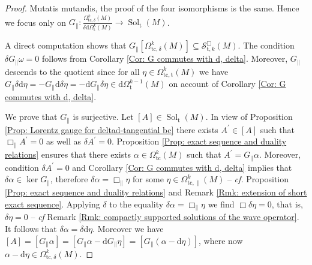 \begin{proof}
	Mutatis mutandis, the proof of the four isomorphisms is the same.
	Hence we focus only on $G_\parallel\colon\frac{\Omega_{\mathrm{tc},\delta}^k(M)}{\delta\mathrm{d}\Omega_\mathrm{t}^k(M)}\to\operatorname{Sol}_{\mathrm{t}}(M)$.
	
	A direct computation shows that $G_\parallel\left[\Omega_{\mathrm{tc},\delta}^k(M)\right]\subseteq\mathcal{S}^\Box_{\mathrm{t},k}(M)$. The condition $\delta G_\parallel\omega=0$ follows from Corollary \ref{Cor: G commutes with d, delta}.
	Moreover, $G_\parallel$ descends to the quotient since for all $\eta\in\Omega_{\mathrm{tc},\mathrm{t}}^k(M)$ we have $G_\parallel\delta\mathrm{d}\eta=-G_\parallel\mathrm{d}\delta\eta=-\mathrm{d}G_\parallel\delta\eta\in\mathrm{d}\Omega_{\mathrm{t}}^{k-1}(M)$ on account of Corollary \ref{Cor: G commutes with d, delta}.
	
	We prove that $G_\parallel$ is surjective. Let $[A]\in\operatorname{Sol}_{\mathrm{t}}(M)$.
	In view of Proposition \ref{Prop: Lorentz gauge for deltad-tangential bc} there exists $A^\prime\in[A]$ such that $\Box_\parallel A^\prime=0$ as well as $\delta A^\prime=0$.
	Proposition \ref{Prop: exact sequence and duality relations} ensures that there exists $\alpha\in\Omega_{\mathrm{tc}}^k(M)$ such that $A^\prime=G_\parallel\alpha$.
	Moreover, condition $\delta A^\prime =0$ and Corollary \ref{Cor: G commutes with d, delta} implies that $\delta\alpha\in\ker G_\parallel$, therefore $\delta\alpha=\Box_\parallel\eta$ for some $\eta\in\Omega_{\mathrm{tc},\parallel}^k(M)$ -- \textit{cf.} Proposition \ref{Prop: exact sequence and duality relations} and Remark \ref{Rmk: extension of short exact sequence}.
	Applying $\delta$ to the equality $\delta\alpha=\Box_\parallel\eta$ we find $\Box\delta\eta=0$, that is, $\delta\eta=0$ -- \textit{cf} Remark \ref{Rmk: compactly supported solutions of the wave operator}.
	It follows that $\delta\alpha=\delta\mathrm{d}\eta$.
	Moreover we have $[A]=[G_\parallel\alpha]=[G_\parallel\alpha-\mathrm{d}G_\parallel\eta]=[G_\parallel(\alpha-\mathrm{d}\eta)]$, where now $\alpha-\mathrm{d}\eta\in\Omega_{\mathrm{tc},\delta}^k(M)$.
	

\end{proof}
